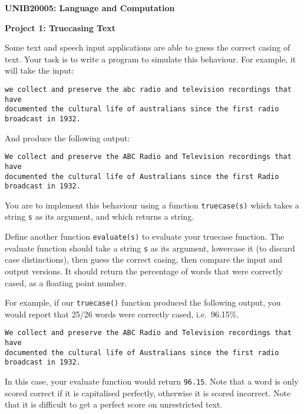 \documentclass[a4paper,10pt]{article}
\begin{document}
\centerline{\LARGE\bf UNIB20005: Language and Computation}\vspace{2ex}

\centerline{\large\bf Project 1: Truecasing Text}\vspace{2ex}

Some text and speech input applications are able to guess the correct casing of text.
Your task is to write a program to simulate this behaviour. For example, it will take
the input:

\begin{verbatim}
we collect and preserve the abc radio and television recordings that have
documented the cultural life of australians since the first radio broadcast in 1932.
\end{verbatim}

And produce the following output:

\begin{verbatim}
We collect and preserve the ABC Radio and Television recordings that have
documented the cultural life of Australians since the first Radio broadcast in 1932.
\end{verbatim}

You are to implement this behaviour using a function \texttt{truecase(s)} which takes a string \texttt{s} as its argument, and which returns a string.

Define another function \texttt{evaluate(s)} to evaluate your truecase function.
The evaluate function should take a string \texttt{s} as its argument, lowercase it (to discard case distinctions),
then guess the correct casing, then compare the input and output versions. It should return the percentage of
words that were correctly cased, as a floating point number.

For example, if our \texttt{truecase()} function produced the following output, you would report that 25/26 words were
correctly cased, i.e.\ 96.15\%.

\begin{verbatim}
We collect and preserve the ABC Radio and Television recordings that have
documented the cultural life of Australians since the first radio broadcast in 1932.
\end{verbatim}

In this case, your evaluate function would return \texttt{96.15}.
Note that a word is only scored correct if it is capitalised perfectly, otherwise it is scored incorrect.
Note that it is difficult to get a perfect score on unrestricted text.
\end{document}
